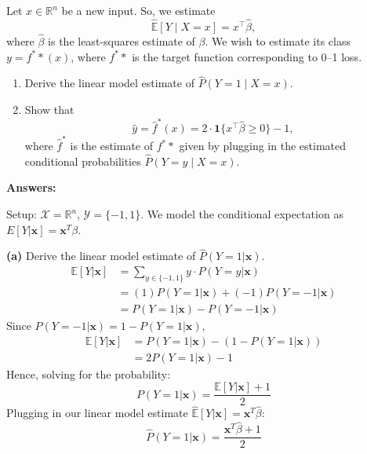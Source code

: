Let \(x \in \mathbb{R}^n\) be a new input. So, we estimate
\[
\hat{\mathbb{E}}[Y \mid X = x] = x^{\top} \hat{\beta},
\]
where \(\hat{\beta}\) is the least-squares estimate of \(\beta\). 
We wish to estimate its class \(y = f^*{\ast}(x)\), 
where \(f^*{\ast}\) is the target function corresponding to 0--1 loss.

\begin{enumerate}
    \item Derive the linear model estimate of 
    \(\hat{P}(Y = 1 \mid X = x)\).
    \item Show that 
    \[
    \hat{y} = \hat{f}^{\ast}(x) = 2 \cdot \mathbf{1}\{x^{\top} \hat{\beta} \geq 0\} - 1,
    \]
    where \(\hat{f}^{\ast}\) is the estimate of \(f^*{\ast}\) given by plugging in 
    the estimated conditional probabilities 
    \(\hat{P}(Y = y \mid X = x)\).
\end{enumerate}

\textbf{Answers:}
\vspace{0.2cm}

Setup: $\mathcal{X} = \mathbb{R}^n$, $\mathcal{Y} = \{-1, 1\}$. We model the conditional expectation as $E[Y|\mathbf{x}] = \mathbf{x}^T\beta$.

\textbf{(a)} Derive the linear model estimate of $\hat{P}(Y=1|\mathbf{x})$.
\begin{align*}
    \mathbb{E}[Y|\mathbf{x}] &= \sum_{y \in \{-1,1\}} y \cdot P(Y=y|\mathbf{x}) \\
    &= (1)P(Y=1|\mathbf{x}) + (-1)P(Y=-1|\mathbf{x}) \\
    &= P(Y=1|\mathbf{x}) - P(Y=-1|\mathbf{x})
\end{align*}
Since $P(Y=-1|\mathbf{x}) = 1 - P(Y=1|\mathbf{x})$,
\begin{align*}
    \mathbb{E}[Y|\mathbf{x}] &= P(Y=1|\mathbf{x}) - (1 - P(Y=1|\mathbf{x})) \\
    &= 2P(Y=1|\mathbf{x}) - 1
\end{align*}
Hence, solving for the probability:
\[ P(Y=1|\mathbf{x}) = \frac{\mathbb{E}[Y|\mathbf{x}] + 1}{2} \]
Plugging in our linear model estimate $\hat{\mathbb{E}}[Y|\mathbf{x}] = \mathbf{x}^T\hat{\beta}$:
\[ \hat{P}(Y=1|\mathbf{x}) = \frac{\mathbf{x}^T\hat{\beta} + 1}{2} \]

